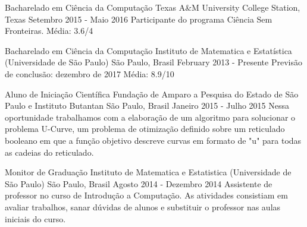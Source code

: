 \documentclass[11pt, a4paper]{awesome-cv-res}
\begin{document}
\makecvheader
\makecvfooter
  {}
  {}
  {\thepage}



\begin{cventries}
\cventry
{Bacharelado em Ciência da Computação}
{Texas A\&M University}
{College Station, Texas}
{Setembro 2015 - Maio 2016}
{Participante do programa Ciência Sem Fronteiras. \newline Média: 3.6/4}
\newline 
\newline

\cventry
{Bacharelado em Ciência da Computação} %
{Instituto de Matematica e Estatística (Universidade de São Paulo)} %
{São Paulo, Brasil} %
{February 2013 - Presente} %
{Previsão de conclusão: dezembro de 2017 \newline Média: 8.9/10}
\end{cventries}

\begin{cventries}
\cventry
{Aluno de Iniciação Científica}
{Fundação de Amparo a Pesquisa do Estado de São Paulo e Instituto Butantan}
{São Paulo, Brasil}
{Janeiro 2015 - Julho 2015}
{Nessa oportunidade trabalhamos com a elaboração de um algoritmo para solucionar o problema U-Curve, um problema de otimização definido sobre um reticulado booleano em que a função objetivo descreve curvas em formato de "u" para todas as cadeias do reticulado.}
\newline 
\newline

\cventry
{Monitor de Graduação} 
{Instituto de Matematica e Estatistica (Universidade de São Paulo)} 
{São Paulo, Brasil}
{Agosto 2014 - Dezembro 2014}
{Assistente de professor no curso de Introdução a Computação. As atividades consistiam em avaliar trabalhos, sanar dúvidas de alunos e substituir o professor nas aulas iniciais do curso.}
\end{cventries}
\end{document}

